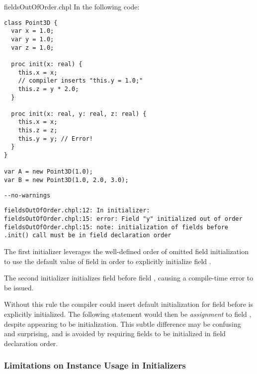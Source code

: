 \begin{chapelexample}{fieldsOutOfOrder.chpl}
In the following code:
\begin{chapel}
\begin{verbatim}
class Point3D {
  var x = 1.0;
  var y = 1.0;
  var z = 1.0;

  proc init(x: real) {
    this.x = x;
    // compiler inserts "this.y = 1.0;"
    this.z = y * 2.0;
  }

  proc init(x: real, y: real, z: real) {
    this.x = x;
    this.z = z;
    this.y = y; // Error!
  }
}

var A = new Point3D(1.0);
var B = new Point3D(1.0, 2.0, 3.0);
\end{verbatim}
\end{chapel}
\begin{chapelcompopts}
\begin{verbatim}
--no-warnings
\end{verbatim}
\end{chapelcompopts}
\begin{chapeloutput}
\begin{verbatim}
fieldsOutOfOrder.chpl:12: In initializer:
fieldsOutOfOrder.chpl:15: error: Field "y" initialized out of order
fieldsOutOfOrder.chpl:15: note: initialization of fields before .init() call must be in field declaration order
\end{verbatim}
\end{chapeloutput}

The first initializer leverages the well-defined order of omitted field
initialization to use the default value of field  in order to
explicitly initialize field .

The second initializer initializes field  before field ,
causing a compile-time error to be issued.

\end{chapelexample}

\begin{rationale}
Without this rule the compiler could insert default initialization for field
 before  is explicitly initialized. The following statement
would then be {\em assignment} to field , despite appearing to be
initialization. This subtle difference may be confusing and surprising, and
is avoided by requiring fields to be initialized in field declaration order.
\end{rationale}

\subsubsection{Limitations on Instance Usage in Initializers}
\label{Limitations_on_Instance_Usage_in_Initializers}

